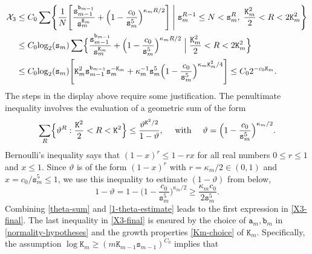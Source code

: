 \documentclass[12pt, twoside]{article}
\theoremstyle{definition}
\numberwithin{equation}{section}
\begin{document}
\begin{align} 
\mathcal X_3 &\leq C_0 \sum \Biggl\{ \frac{1}{N} \Biggl[ \frac{\mathtt s_{m-1}^{\mathtt b_{m-1}}}{\mathtt s_m^{\mathtt K_m}}   + \Bigl(1 - \frac{c_0}{\mathtt s_m^5}\Bigr)^{\kappa_m R/2} \Biggr] \; \Biggl| \; \mathtt s_m^{R-1} \leq N < \mathtt s_m^R, \; \frac{\mathtt K_m^2}{2} <  R < 2 \mathtt K_m^2   \Biggr\} \nonumber \\ 
&\leq C_0 {\log_2 }(\mathtt s_m) \sum \Bigl\{ \frac{\mathtt s_{m-1}^{\mathtt b_{m-1}}}{\mathtt s_m^{\mathtt K_m}}   + \Bigl(1 - \frac{c_0}{\mathtt s_m^5}\Bigr)^{\kappa_m R/2} \; \Bigl| \; \frac{\mathtt K_m^2}{2} < R < 2\mathtt K_m^2   \Bigr\} \nonumber \\ 
&\leq C_0 {\log_2 }(\mathtt s_m) \Biggl[\mathtt K_m^2  \mathtt s_{m-1}^{\mathtt b_{m-1}}\mathtt s_m^{-\mathtt K_m} + \kappa_m^{-1} \mathtt s_m^5 \Bigl(1 - \frac{c_0}{\mathtt s_m^5}\Bigr)^{\kappa_m \mathtt K_m^2/4} \Biggr] \leq C_0 2^{-{c_0} \mathtt K_m}. \label{X3-final}
\end{align} 
The steps in the display above require some justification. The penultimate inequality involves the evaluation of a geometric sum  of the form 
\begin{equation} \label{theta-sum} \sum_{R} \Bigl\{ \vartheta^{R}: \frac{\mathtt K^2}{2} < R < \mathtt K^2\Bigr\} \leq \frac{\vartheta^{\mathtt K^2/2}}{1 - \vartheta}, \quad \text{ with } \quad \vartheta =  \Bigl(1 - \frac{c_0}{\mathtt s_m^5}\Bigr)^{\kappa_m /2}. \end{equation}  Bernoulli's inequality says that $(1-x)^r\le 1-rx$ for all real numbers $0\le r\le 1$ and $x\leq 1$. Since $\vartheta$ is of the form $(1-x)^r$ with $r = \kappa_m/2 \in (0,1)$ and $x = c_0/\mathtt s_m^5 \leq 1$, we use this inequality to estimate $(1 - \vartheta)$ from below,  
\begin{equation}  \label{1-theta-estimate}
1 - \vartheta = 1 - \Big(1 - \frac{c_0}{\mathtt s_m^5}\Big)^{\kappa_m/2}
\geq \frac{\kappa_m c_0}{2 \mathtt s_m^5}.
\end{equation}
Combining \eqref{theta-sum} and \eqref{1-theta-estimate} leads to the first expression in \eqref{X3-final}. The last inequality in \eqref{X3-final} is ensured by the choice of $\mathtt a_m, \mathtt b_m$ {in \eqref{normality-hypotheses} } and the growth properties \eqref{Km-choice} of $\mathtt K_m$. Specifically, the assumption $\log \mathtt K_m \geq (m \mathtt K_{m-1} \mathtt s_{m-1})^{C_0}$ implies that
\end{document}
